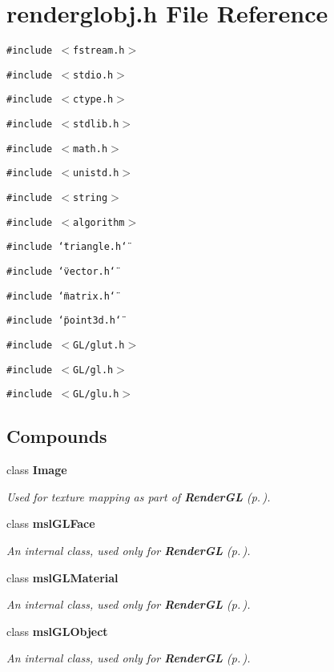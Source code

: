 \section{renderglobj.h File Reference}
\label{renderglobj_h}
{\tt \#include $<$fstream.h$>$}\par
{\tt \#include $<$stdio.h$>$}\par
{\tt \#include $<$ctype.h$>$}\par
{\tt \#include $<$stdlib.h$>$}\par
{\tt \#include $<$math.h$>$}\par
{\tt \#include $<$unistd.h$>$}\par
{\tt \#include $<$string$>$}\par
{\tt \#include $<$algorithm$>$}\par
{\tt \#include \char`\"{}triangle.h\char`\"{}}\par
{\tt \#include \char`\"{}vector.h\char`\"{}}\par
{\tt \#include \char`\"{}matrix.h\char`\"{}}\par
{\tt \#include \char`\"{}point3d.h\char`\"{}}\par
{\tt \#include $<$GL/glut.h$>$}\par
{\tt \#include $<$GL/gl.h$>$}\par
{\tt \#include $<$GL/glu.h$>$}\par
\subsection*{Compounds}
\begin{CompactItemize}
\item 
class {\bf Image}
\begin{CompactList}\small\item\em Used for texture mapping as part of {\bf Render\-GL} {\rm (p.\,\pageref{class_RenderGL})}.\item\end{CompactList}\item 
class {\bf msl\-GLFace}
\begin{CompactList}\small\item\em An internal class, used only for {\bf Render\-GL} {\rm (p.\,\pageref{class_RenderGL})}.\item\end{CompactList}\item 
class {\bf msl\-GLMaterial}
\begin{CompactList}\small\item\em An internal class, used only for {\bf Render\-GL} {\rm (p.\,\pageref{class_RenderGL})}.\item\end{CompactList}\item 
class {\bf msl\-GLObject}
\begin{CompactList}\small\item\em An internal class, used only for {\bf Render\-GL} {\rm (p.\,\pageref{class_RenderGL})}.\item\end{CompactList}\end{CompactItemize}
